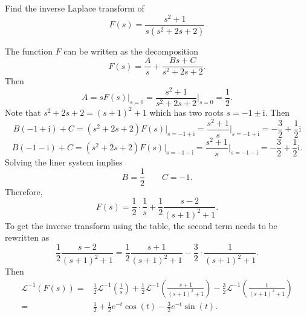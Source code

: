 \begin{example}
  Find the inverse Laplace transform of
  \[F(s)=\frac{s^2+1}{s(s^2+2s+2)}\]
\end{example}
\begin{solution}
  The function $F$ can be written as the decomposition
  \[F(s)=\frac{A}{s}+\frac{Bs+C}{s^2+2s+2}.\]
  Then
  \[A=sF(s)\Big|_{s=0}=\frac{s^2+1}{s^2+2s+2}\Big|_{s=0}=\frac12.\]
  Note that $s^2+2s+2=(s+1)^2+1$ which has two roots $s=-1\pm \mathrm{i}$.
  Then
  \[B(-1+\mathrm{i})+C=(s^2+2s+2)F(s)\Big|_{s=-1+\mathrm{i}}=\frac{s^2+1}{s}\Big|_{s=-1+\mathrm{i}}=-\frac32+\frac12\mathrm{i}\tag{1}\]
  \[B(-1-\mathrm{i})+C=(s^2+2s+2)F(s)\Big|_{s=-1-\mathrm{i}}=\frac{s^2+1}{s}\Big|_{s=-1-\mathrm{i}}=-\frac32+\frac12\mathrm{i}.\tag{2}\]
  Solving the liner system implies
  \[B=\frac12\qquad C=-1.\]
  Therefore,
  \[F(s)=\frac{1}{2}\cdot\frac{1}{s}+\frac12\frac{s-2}{(s+1)^2+1}.\]
  To get the inverse transform using the table, the second term needs to be rewritten as
  \[\frac12\frac{s-2}{(s+1)^2+1}=\frac12\frac{s+1}{(s+1)^2+1}-\frac32\cdot\frac{1}{(s+1)^2+1}.\]
  Then
  \[
  \begin{aligned}
    \mathcal{L}^{-1}(F(s))
    =&\frac12\mathcal{L}^{-1}\left(\frac1s\right)+\frac12\mathcal{L}^{-1}\left(\frac{s+1}{(s+1)^2+1}\right)-\frac32\mathcal{L}^{-1}\left(\frac{1}{(s+1)^2+1}\right)\\
    =&\frac12+\frac12e^{-t}\cos(t)-\frac32e^{-t}\sin(t).
  \end{aligned}  
  \]
\end{solution}



